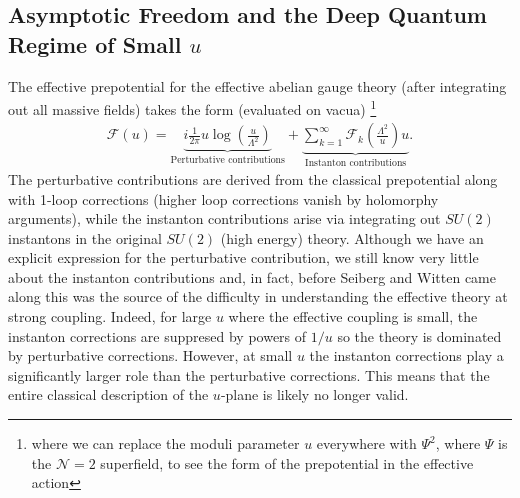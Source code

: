 \documentclass[12pt, onecolumn]{article}
\begin{document}
\subsection{Asymptotic Freedom and the Deep Quantum Regime of Small $u$}
The effective prepotential for the effective abelian gauge theory (after integrating out all massive fields) takes the form (evaluated on vacua) \footnote{where we can replace the moduli parameter $u$ everywhere with $\Psi^2$, where $\Psi$ is the $\mathcal{N}=2$ superfield, to see the form of the prepotential in the effective action}
\begin{align*}
\mathcal{F}(u)=\underbrace{i\frac{1}{2\pi}u\log\left(\frac{u}{\Lambda^2}\right)}_{\text{Perturbative contributions}}+\underbrace{\sum_{k=1}^{\infty}\mathcal{F}_{k}\left(\frac{\Lambda^2}{u}\right)u}_{{\text{Instanton contributions}}}.
\end{align*}
The perturbative contributions are derived from the classical prepotential along with 1-loop corrections (higher loop corrections vanish by holomorphy arguments), while the instanton contributions arise via integrating out $SU(2)$ instantons in the original $SU(2)$ (high energy) theory.  Although we have an explicit expression for the perturbative contribution, we still know very little about the instanton contributions and, in fact, before Seiberg and Witten came along this was the source of the difficulty in understanding the effective theory at strong coupling.  Indeed, for large $u$ where the effective coupling is small, the instanton corrections are suppresed by powers of $1/u$ so the theory is dominated by perturbative corrections.  However, at small $u$ the instanton corrections play a significantly larger role than the perturbative corrections.  This means that the entire classical description of the $u$-plane is likely no longer valid.

\vspace{5mm}
\end{document}
